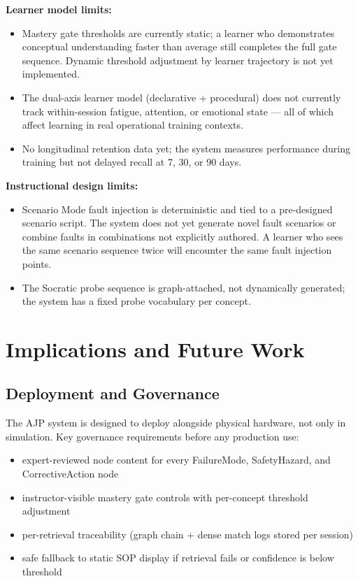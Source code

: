\documentclass[10pt,letterpaper,twocolumn]{article}
\begin{document}
\textbf{Learner model limits:}
\begin{itemize}
  \item Mastery gate thresholds are currently static; a learner who demonstrates conceptual understanding faster than average still completes the full gate sequence. Dynamic threshold adjustment by learner trajectory is not yet implemented.
  \item The dual-axis learner model (declarative + procedural) does not currently track within-session fatigue, attention, or emotional state --- all of which affect learning in real operational training contexts.
  \item No longitudinal retention data yet; the system measures performance during training but not delayed recall at 7, 30, or 90 days.
\end{itemize}

\textbf{Instructional design limits:}
\begin{itemize}
  \item Scenario Mode fault injection is deterministic and tied to a pre-designed scenario script. The system does not yet generate novel fault scenarios or combine faults in combinations not explicitly authored. A learner who sees the same scenario sequence twice will encounter the same fault injection points.
  \item The Socratic probe sequence is graph-attached, not dynamically generated; the system has a fixed probe vocabulary per concept.
\end{itemize}

\section{Implications and Future Work}
\label{sec:implications}

\subsection{Deployment and Governance}
The AJP system is designed to deploy alongside physical hardware, not only in simulation. Key governance requirements before any production use:

\begin{itemize}
  \item expert-reviewed node content for every FailureMode, SafetyHazard, and CorrectiveAction node
  \item instructor-visible mastery gate controls with per-concept threshold adjustment
  \item per-retrieval traceability (graph chain + dense match logs stored per session)
  \item safe fallback to static SOP display if retrieval fails or confidence is below threshold
\end{itemize}
\end{document}
